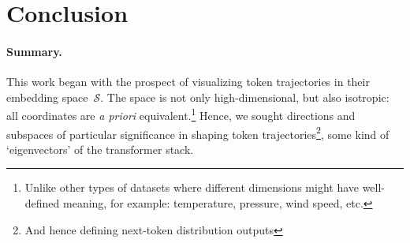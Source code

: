\documentclass{article} %
\begin{document}
\section{Conclusion}









\paragraph{Summary.}
This work began with the prospect of visualizing token trajectories in their embedding space~$\mathcal{S}$.
The space is not only high-dimensional, but also isotropic: all coordinates are \textit{a priori} equivalent.\footnote{Unlike other types of datasets where different dimensions might have well-defined meaning, for example: temperature, pressure, wind speed, etc.} 
Hence, we sought directions and subspaces of particular significance in shaping token trajectories\footnote{And hence defining next-token distribution outputs}, some kind of `eigenvectors' of the transformer stack.
\end{document}

